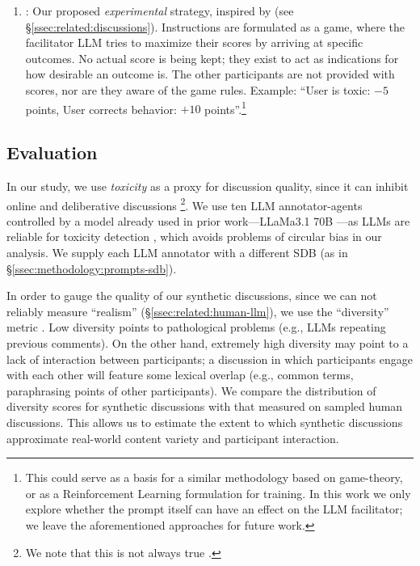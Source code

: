 \begin{enumerate}
	\item \textbf{\strategymodgame}: Our proposed \emph{experimental} strategy, inspired by \citet{abdelnabi_negotiations} (see \S\ref{ssec:related:discussions}). Instructions are formulated as a game, where the facilitator LLM tries to maximize their scores by arriving at specific outcomes. No actual score is being kept; they exist to act as indications for how desirable an outcome is. The other participants are not provided with scores, nor are they aware of the game rules. Example: ``User is toxic: $-5$ points, User corrects behavior: $+10$ points''.\footnote{This could serve as a basis for a similar methodology based on game-theory, or as a Reinforcement Learning formulation for training. In this work we only explore whether the prompt itself can have an effect on the LLM facilitator; we leave the aforementioned approaches for future work.}
\end{enumerate}



\subsection{Evaluation}
\label{ssec:experimental:evaluation}

In our study, we use \emph{toxicity} as a proxy for discussion quality, since it can inhibit online and deliberative discussions \citep{dekock2022disagree, XiaToxicity}\footnote{We note that this is not always true \citep{Avalle2024PersistentIP}.}. We use ten LLM annotator-agents controlled by a model already used in prior work---LLaMa3.1 70B \citep{kang-qian-2024-implanting}---as LLMs are reliable for toxicity detection \citep{kang-qian-2024-implanting, Wang2022ToxicityDW, anjum2024hate}, which avoids problems of circular bias in our analysis. We supply each LLM annotator with a different SDB (as in \S\ref{ssec:methodology:prompts-sdb}).

In order to gauge the quality of our synthetic discussions, since we can not reliably measure ``realism'' (\S\ref{ssec:related:human-llm}), we use the ``diversity'' metric \citep{ulmer2024}. Low diversity points to pathological problems (e.g., LLMs repeating previous comments). On the other hand, extremely high diversity may point to a lack of interaction between participants; a discussion in which participants engage with each other will feature some lexical overlap (e.g., common terms, paraphrasing points of other participants). We compare the distribution of diversity scores for synthetic discussions with that measured on sampled human discussions. This allows us to estimate the extent to which synthetic discussions approximate real-world content variety and participant interaction. 

